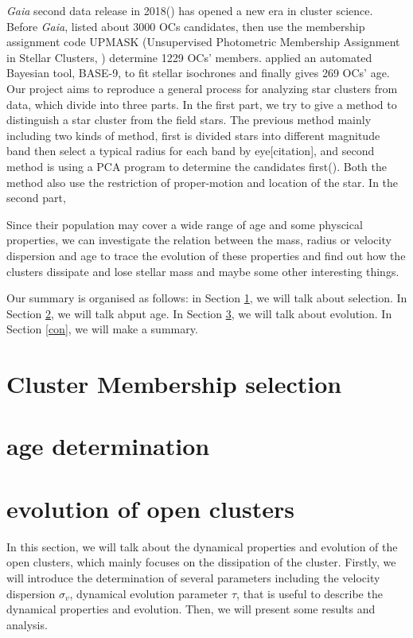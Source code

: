 \documentclass[modern]{aastex63}
\begin{document}
\emph{Gaia} second data release in 2018(\cite{2018A&A...616A..12G}) has opened a new era in cluster science. Before \emph{Gaia}, \cite{2013A&A...558A..53K} listed about 3000 OCs candidates, then \cite{2018A&A...618A..93C} use the membership assignment code
UPMASK (Unsupervised Photometric Membership Assignment in Stellar Clusters, \cite{2014A&A...561A..57K}) determine 1229 OCs' members. \cite{2019A&A...623A.108B} applied an automated Bayesian tool, BASE-9, to fit stellar isochrones and finally gives 269 OCs' age. Our project aims to reproduce a general process for analyzing star clusters from data, which divide into three parts. 
In the first part, we try to give a method to distinguish a star cluster from the field stars. The previous method mainly including two kinds of method, first is divided stars into different magnitude band then select a typical radius for each band by eye[citation], and second method is using a PCA program to determine the candidates first(\cite{2018A&A...618A..93C}). Both the method also use the restriction of proper-motion and location of the star. 
In the second part,  

Since their population may cover a wide range of age and some physcical properties, we can investigate the relation between the mass, radius or velocity dispersion and age to trace the evolution of these properties and find out how the clusters dissipate and lose stellar mass and maybe some other interesting things.

Our summary is organised as follows: in Section \ref{selection}, we will talk about selection. In Section \ref{age}, we will talk abput age. In Section \ref{evolution}, we will talk about evolution. In Section \ref{con}, we will make a summary.

\bigskip
\bigskip
\section{Cluster Membership selection}\label{selection}






\bigskip
\bigskip
\section{age determination}\label{age}




\bigskip
\bigskip
\section{evolution of open clusters}\label{evolution}
In this section, we will talk about the dynamical properties and evolution of the open clusters, which mainly focuses on the dissipation of the cluster. Firstly, we will introduce the determination of several parameters including the velocity dispersion $\sigma_v$, dynamical evolution parameter $\tau$, that is useful to describe the dynamical properties and evolution. Then, we will present some results and analysis.
\end{document}
